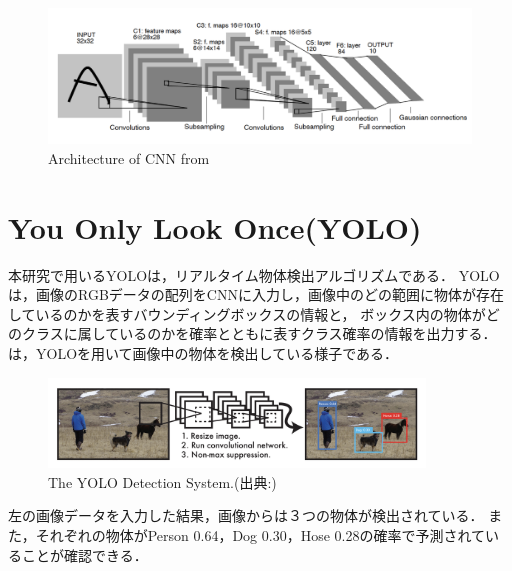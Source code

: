 \documentclass[../main]{subfiles}
\begin{document}
        \begin{figure}[H]
         \centering
         \includegraphics[width=15cm]{../images/cnn_exp.png}
         \caption{Architecture of CNN from\cite{cnn_paper}}
         \label{figure::cnn}
        \end{figure}

        \newpage

        \section{You Only Look Once(YOLO)}
        本研究で用いるYOLO\cite{yolo_paper_v1}\cite{yolo_paper_v2}\cite{yolo_paper_v3}\cite{yolo_paper_v4}は，リアルタイム物体検出アルゴリズムである．
        YOLOは，画像のRGBデータの配列をCNNに入力し，画像中のどの範囲に物体が存在しているのかを表すバウンディングボックスの情報と，
        ボックス内の物体がどのクラスに属しているのかを確率とともに表すクラス確率の情報を出力する．
        は，YOLOを用いて画像中の物体を検出している様子である． 

        \begin{figure}[H]
        \centering
        \includegraphics[width=10cm]{../images/yolo_exp.png}
        \caption{The YOLO Detection System.(出典:\cite{yolo_paper_v1})}
        \label{figure::yolo_exp}
        \end{figure}
        左の画像データを入力した結果，画像からは３つの物体が検出されている．
        また，それぞれの物体がPerson 0.64，Dog 0.30，Hose 0.28の確率で予測されていることが確認できる．
    
\end{document}
